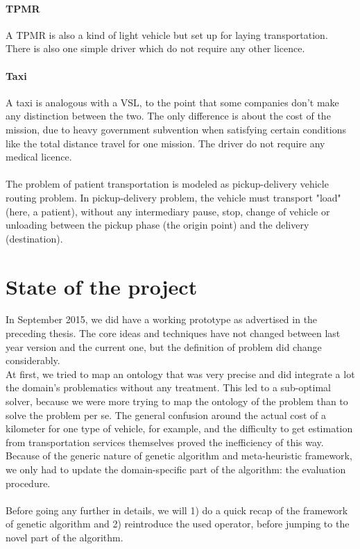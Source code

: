 \documentclass[12pt]{memoir}
\begin{document}
  \paragraph{TPMR} %
\label{par:TPMR}
A TPMR is also a kind of light vehicle but set up for laying transportation. There is
also one simple driver which do not require any other licence. 

  \paragraph{Taxi} %
\label{par:Taxi}
A taxi is analogous with a VSL, to the point that some companies don't make any
distinction between the two. The only difference is about the cost of the mission,
due to heavy government subvention when satisfying certain conditions like the total
distance travel for one mission. The driver do not require any medical licence.\\
\\
The problem of patient transportation is modeled as pickup-delivery vehicle routing
problem. In pickup-delivery problem, the vehicle must transport "load" (here, a
patient), without any intermediary pause, stop, change of vehicle or unloading
between the pickup phase (the origin point) and the delivery (destination).

\newpage

\section{State of the project}
In September 2015, we did have a working prototype as advertised in the preceding
thesis. The core ideas and techniques have not changed between last year version
and the current one, but the definition of problem did change considerably. \\
At first, we tried to map an ontology that was very precise and did integrate a lot
the domain's problematics without any treatment. This led to a sub-optimal solver,
because we were more trying to map the ontology of the problem than to solve the
problem per se. The general confusion around the actual cost of a kilometer for
one type of vehicle, for example, and the difficulty to get estimation from transportation services
themselves proved the inefficiency of this way.\\
Because of the generic nature of genetic algorithm and meta-heuristic framework, we only
had to update the domain-specific part of the algorithm: the evaluation procedure.\\
\\
Before going any further in details, we will 1) do a quick recap of the framework
of genetic algorithm and 2) reintroduce the used operator, before jumping to the
novel part of the algorithm.
\end{document}
